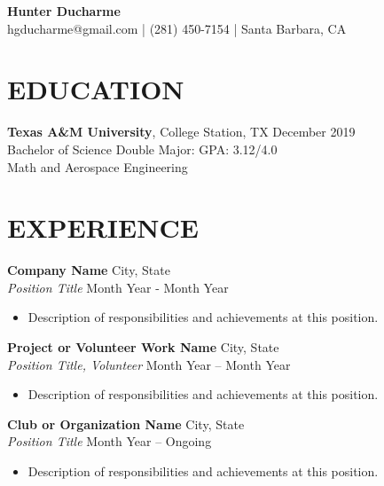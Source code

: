 \documentclass[a4paper,9pt]{extarticle}
\begin{document}
\pagestyle{empty}

\begin{center}
\textbf{\Large Hunter Ducharme}\\[2pt] %
hgducharme@gmail.com | (281) 450-7154 | Santa Barbara, CA%
\end{center}

\section*{EDUCATION}
\noindent
\textbf{Texas A\&M University}, College Station, TX \hfill December 2019\\ %
\hspace{10mm} Bachelor of Science Double Major:  \hfill GPA: 3.12/4.0\\ %
Math and Aerospace Engineering

\section*{EXPERIENCE}
\noindent
\textbf{Company Name} \hfill City, State\\ %
\textit{Position Title} \hfill Month Year - Month Year %
\begin{itemize}
    \item Description of responsibilities and achievements at this position. %
\end{itemize}

\noindent
\textbf{Project or Volunteer Work Name} \hfill City, State\\ %
\textit{Position Title, Volunteer} \hfill Month Year – Month Year %
\begin{itemize}
    \item Description of responsibilities and achievements at this position. %
\end{itemize}

\textbf{Club or Organization Name} \hfill City, State\\ %
\textit{Position Title} \hfill Month Year – Ongoing %
\begin{itemize}
    \item Description of responsibilities and achievements at this position. %
\end{itemize}
\end{document}
